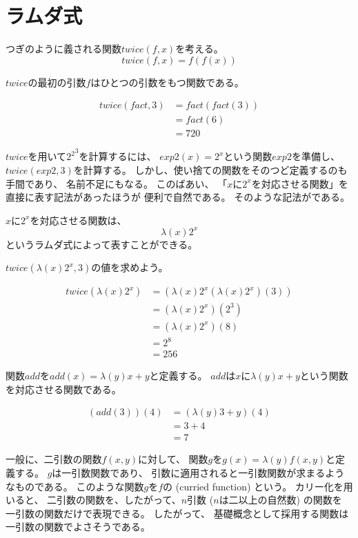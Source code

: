 \documentclass[fleqn]{jsarticle}
\begin{document}
\section{ラムダ式}

つぎのように義される関数$twice(f,x)$を考える。
\[
  twice(f,x) = f(f(x))
\]

$twice$の最初の引数$f$はひとつの引数をもつ関数である。

\begin{align*}
  twice(fact , 3) &= fact (fact (3))\\
                  &= fact(6)\\
                  &= 720
\end{align*}

$twice$を用いて${2^2}^3$を計算するには、
$exp2(x) = 2^x$という関数$exp2$を準備し、
$twice( exp2 , 3 )$を計算する。
しかし、使い捨ての関数をそのつど定義するのも手間であり、
名前不足にもなる。
このばあい、
「$x$に$2^x$を対応させる関数」を直接に表す記法があったほうが
便利で自然である。
そのような記法がである。

$x$に$2^x$を対応させる関数は、
\[ \lambda (x) 2^x \]
というラムダ式によって表すことができる。

$twice( \lambda (x) 2^x , 3)$の値を求めよう。

\begin{align*}
  twice( \lambda (x) 2^x ) &= ( \lambda (x) 2^x ( \lambda (x) 2^x )(3))\\
                           &= ( \lambda (x) 2^x ) (2^3)\\
                           &= ( \lambda (x) 2^x ) (8)\\
                           &= 2^8\\
                           &= 256
\end{align*}

関数$add$を$add (x) = \lambda (y) x+y$と定義する。
$add$は$x$に$\lambda (y) x+y$という関数を対応させる関数である。

\begin{align*}
  (add(3))(4) &= ( \lambda (y) 3 + y)(4)\\
              &= 3 + 4\\
              &= 7
\end{align*}

一般に、二引数の関数$f(x,y)$に対して、
関数$g$を$g(x) = \lambda (y) f(x,y)$と定義する。
$g$は一引数関数であり、
引数に適用されると一引数関数が求まるようなものである。
このような関数$g$を$f$の (curried function) という。
カリー化を用いると、
二引数の関数を、したがって、$n$引数 ($n$は二以上の自然数) の関数を
一引数の関数だけで表現できる。
したがって、
基礎概念として採用する関数は一引数の関数でよさそうである。
\end{document}
